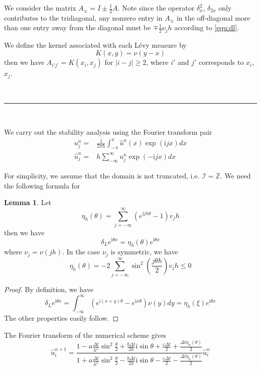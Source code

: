 \documentclass[10pt,a4paper]{article}
\newcommand{\ii}[0]{\mathrm{i}}
\theoremstyle{definition}
\newtheorem{lemma}{Lemma}
\begin{document}
We consider the matrix $A_\pm = I \pm \frac{1}{2}A$. Note since the operator $\delta_x^2$, $\delta_{2x}$ only contributes to the tridiagonal, any nonzero entry in $A_\pm$ in the off-diagonal more than one entry away from the diagonal must be $\mp\frac{1}{2}\nu_jh$ according to \cref{equ:dl}. 

We define the kernel associated with each L\'evy measure by
\begin{equation}
	K(x,y) = \nu(y-x)
\end{equation}
then we have $A_{i'j'}=K(x_{i},x_{j})$ for $|i-j|\geq 2$, where $i'$ and $j'$ corresponds to $x_{i}$, $x_j$.

\

\hrule

\

We carry out the stability analysis using the Fourier transform pair
\begin{align}
	u_j^n =& \frac{1}{2\pi h}\int_{-\pi}^\pi \hat u^n(x) \exp(\ii j x)dx\\
	\hat u_j^n =&  h \sum_{-\infty}^\infty u_j^n \exp(-\ii jx)dx
\end{align}

For simplicity, we assume that the domain is not truncated, i.e. $\mathcal{I}=\mathbb{Z}$. We need the following formula for 
\begin{lemma}
	Let 
	\begin{equation}
		\eta_h(\theta) = \sum_{j=-\infty}^\infty (e^{\ii jh\theta}-1)v_jh
	\end{equation}
	then we have
	\begin{equation}
		\delta_L e^{\ii \theta x} = \eta_h(\theta) e^{\ii \theta x}
	\end{equation}
	where $\nu_j = \nu(jh)$. In the case $\nu_j$ is symmetric, we have
	\begin{equation}
		\eta_h(\theta) = -2\sum_{j=-\infty}^\infty \sin^2\left(\frac{j\theta h}{2} \right) v_jh\leq 0
	\end{equation}
\end{lemma}
\begin{proof}
	By definition, we have
	\[{\delta _L}{e^{\ii\theta x}} = \int_{ - \infty }^\infty  {\left( {{e^{\ii(x + y)\theta }} - {e^{\ii x\theta }}} \right)\nu (y)dy = {\eta _h}(\xi )} {e^{\ii\theta x}}\]
	The other properties easily follow. 
\end{proof}

The Fourier transform of the numerical scheme gives
\begin{equation}\label{equ:von}
	\hat u_i^{n+1} = \frac{{1 - a\frac{{\Delta t}}{{{h^2}}}{{\sin }^2}\frac{\theta }{2} + \frac{{b\Delta t}}{{2h}}\ii\sin \theta  + \frac{{c\Delta t}}{2}+ \frac{{\Delta t\eta_h (\theta )}}{2}}}{{1 + a\frac{{\Delta t}}{{{h^2}}}{{\sin }^2}\frac{\theta }{2} - \frac{{b\Delta t}}{{2h}}\ii\sin \theta  - \frac{{c\Delta t}}{2} - \frac{{\Delta t\eta_h (\theta )}}{2}}} \hat u_i^n
\end{equation}
\end{document}
